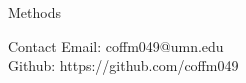 \documentclass[final]{beamer}
\newlength{\onecolwid}
\begin{document}
\begin{frame}[t]
\begin{columns}[t]
\begin{column}{\onecolwid}
\begin{block}{Methods}
\end{block}



\vspace{1in}

\begin{alertblock}{Contact}
Email: coffm049@umn.edu \\
Github: https://github.com/coffm049
\end{alertblock}


\end{column}
\end{columns}
\end{frame}
\end{document}
